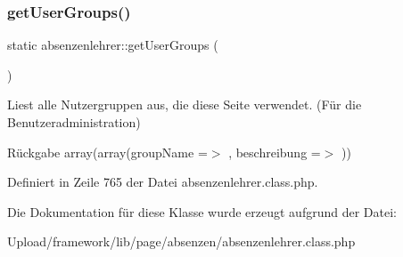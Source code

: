 \subsubsection{\texorpdfstring{get\+User\+Groups()}{getUserGroups()}}
{\footnotesize\ttfamily static absenzenlehrer\+::get\+User\+Groups (\begin{DoxyParamCaption}{ }\end{DoxyParamCaption})\hspace{0.3cm}{\ttfamily [static]}}

Liest alle Nutzergruppen aus, die diese Seite verwendet. (Für die Benutzeradministration) \begin{DoxyReturn}{Rückgabe}
array(array(\textquotesingle{}group\+Name\textquotesingle{} =$>$ \textquotesingle{}\textquotesingle{}, \textquotesingle{}beschreibung\textquotesingle{} =$>$ \textquotesingle{}\textquotesingle{})) 
\end{DoxyReturn}


Definiert in Zeile 765 der Datei absenzenlehrer.\+class.\+php.



Die Dokumentation für diese Klasse wurde erzeugt aufgrund der Datei\+:\begin{DoxyCompactItemize}
\item 
Upload/framework/lib/page/absenzen/absenzenlehrer.\+class.\+php\end{DoxyCompactItemize}
